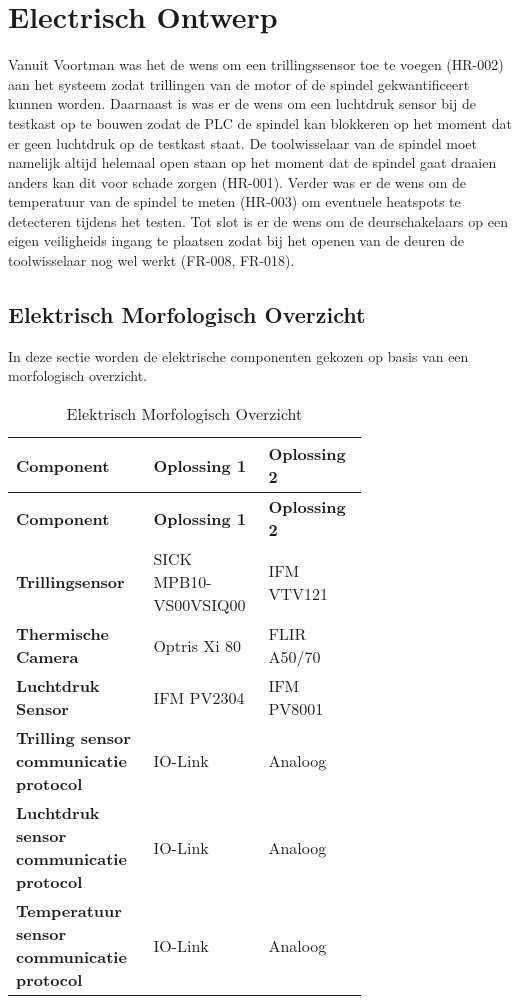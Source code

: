 \section{Electrisch Ontwerp}

Vanuit Voortman was het de wens om een trillingssensor toe te voegen (HR-002) aan het systeem zodat trillingen van de motor of de spindel gekwantificeert kunnen worden. Daarnaast is was er de wens om een luchtdruk sensor bij de testkast op te bouwen zodat de \gls{PLC} de spindel kan blokkeren op het moment dat er geen luchtdruk op de testkast staat. De toolwisselaar van de spindel moet namelijk altijd helemaal open staan op het moment dat de spindel gaat draaien anders kan dit voor schade zorgen (HR-001). Verder was er de wens om de temperatuur van de spindel te meten (HR-003) om eventuele heatspots te detecteren tijdens het testen. Tot slot is er de wens om de deurschakelaars op een eigen veiligheids ingang te plaatsen zodat bij het openen van de deuren de toolwisselaar nog wel werkt (FR-008, FR-018).

\subsection{Elektrisch Morfologisch Overzicht} \label{sec:ElecMorf}

In deze sectie worden de elektrische componenten gekozen op basis van een morfologisch overzicht.

\begin{xltabular}{\linewidth}{|p{0.3\linewidth}|p{0.2\linewidth}|p{0.2\linewidth}|}
	\caption{Elektrisch Morfologisch Overzicht} \\
	\hline
	\textbf{Component} & \textbf{Oplossing 1} & \textbf{Oplossing 2} \\
	\hline
	\endfirsthead
	\hline
	\textbf{Component} & \textbf{Oplossing 1} & \textbf{Oplossing 2} \\
	\hline
	\endhead
	\hline
	\endfoot
	\hline
	\endlastfoot
	\textbf{Trillingsensor} &  SICK MPB10-VS00VSIQ00 & IFM VTV121 \\
	\hline
	\textbf{Thermische Camera} & Optris Xi 80 &  FLIR A50/70 \\
	\hline
	\textbf{Luchtdruk Sensor} &  IFM PV2304 & IFM PV8001 \\
	\hline
	\textbf{Trilling sensor communicatie protocol} &  IO-Link & Analoog \\
	\hline
	\textbf{Luchtdruk sensor communicatie protocol} &   IO-Link & Analoog \\
	\hline 
	\textbf{Temperatuur sensor communicatie protocol} &  IO-Link & Analoog \\
	\hline
\end{xltabular}

